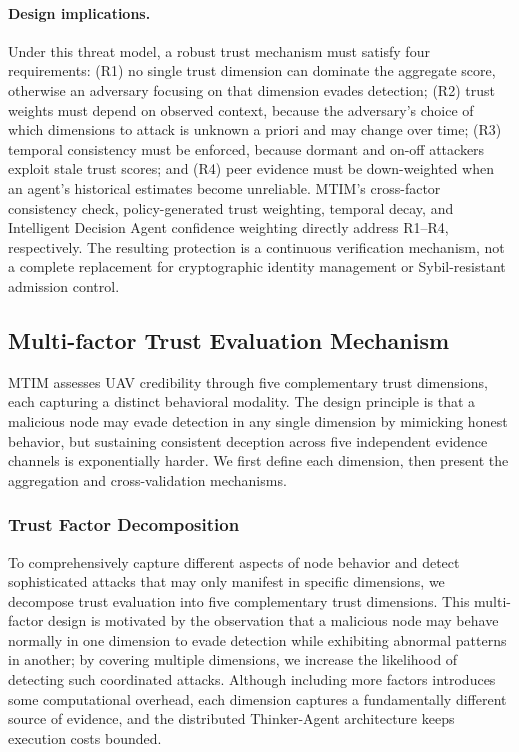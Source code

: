 \documentclass[notspecified,article,submit,moreauthors]{Definitions/mdpi}
\begin{document}
\paragraph{Design implications.}
Under this threat model, a robust trust mechanism must satisfy four requirements: (R1) no single trust dimension can dominate the aggregate score, otherwise an adversary focusing on that dimension evades detection; (R2) trust weights must depend on observed context, because the adversary's choice of which dimensions to attack is unknown a priori and may change over time; (R3) temporal consistency must be enforced, because dormant and on-off attackers exploit stale trust scores; and (R4) peer evidence must be down-weighted when an agent's historical estimates become unreliable. MTIM's cross-factor consistency check, policy-generated trust weighting, temporal decay, and Intelligent Decision Agent confidence weighting directly address R1--R4, respectively. The resulting protection is a continuous verification mechanism, not a complete replacement for cryptographic identity management or Sybil-resistant admission control.

\subsection{Multi-factor Trust Evaluation Mechanism}
\label{sec:trust_eval}
MTIM assesses UAV credibility through five complementary trust dimensions, each capturing a distinct behavioral modality. The design principle is that a malicious node may evade detection in any single dimension by mimicking honest behavior, but sustaining consistent deception across five independent evidence channels is exponentially harder. We first define each dimension, then present the aggregation and cross-validation mechanisms.

\subsubsection{Trust Factor Decomposition}
To comprehensively capture different aspects of node behavior and detect sophisticated attacks that may only manifest in specific dimensions, we decompose trust evaluation into five complementary trust dimensions. This multi-factor design is motivated by the observation that a malicious node may behave normally in one dimension to evade detection while exhibiting abnormal patterns in another; by covering multiple dimensions, we increase the likelihood of detecting such coordinated attacks. Although including more factors introduces some computational overhead, each dimension captures a fundamentally different source of evidence, and the distributed Thinker-Agent architecture keeps execution costs bounded.
\end{document}
